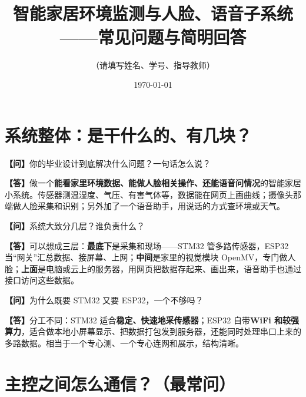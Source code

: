 \documentclass[11pt,a4paper]{ctexart}
\title{\vspace{-1em}{\Huge\bfseries\color{TitleBlue}毕业设计答辩手册}\\[0.6em]
\large 智能家居环境监测与人脸、语音子系统——常见问题与简明回答}
\author{（请填写姓名、学号、指导教师）}
\date{\today}
\newcommand{\答辩问}[1]{\par\noindent\textbf{\color{QColor}【问】}#1\par\vspace{0.35em}}
\newcommand{\答辩答}[1]{\noindent\textbf{【答】}#1\par}
\begin{document}
\maketitle
\thispagestyle{empty}

\begin{center}
\end{center}

\vspace{0.8em}
\tableofcontents
\newpage

\section{系统整体：是干什么的、有几块？}

\begin{qabox}
\答辩问{你的毕业设计到底解决什么问题？一句话怎么说？}
\答辩答{做一个\textbf{能看家里环境数据、能做人脸相关操作、还能语音问情况}的智能家居小系统。传感器测温湿度、气压、有害气体等，数据能在网页上画曲线；摄像头那端做人脸采集和识别；另外加了一个语音助手，用说话的方式查环境或天气。}
\end{qabox}

\begin{qabox}
\答辩问{系统大致分几层？谁负责什么？}
\答辩答{可以想成三层：\textbf{最底下}是采集和现场——STM32 管多路传感器，ESP32 当``网关''汇总数据、接屏幕、上网；\textbf{中间}是家里的视觉模块 OpenMV，专门做人脸；\textbf{上面}是电脑或云上的服务器，用网页把数据存起来、画出来，语音助手也通过接口访问这些数据。}
\end{qabox}

\begin{qabox}
\答辩问{为什么既要 STM32 又要 ESP32，一个不够吗？}
\答辩答{分工不同：STM32 适合\textbf{稳定、快速地采传感器}；ESP32 自带\textbf{WiFi 和较强算力}，适合做本地小屏幕显示、把数据打包发到服务器，还能同时处理串口上来的多路数据。相当于一个专心测、一个专心连网和展示，结构清晰。}
\end{qabox}

\section{主控之间怎么通信？（最常问）}
\end{document}
